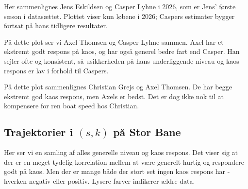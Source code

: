 Her sammenlignes Jens Eskildsen og Casper Lyhne i 2026, som er Jens' første sæson i datasættet. Plottet viser kun løbene i 2026; Caspers estimater bygger fortsat på hans tidligere resultater.


På dette plot ser vi Axel Thomsen og Casper Lyhne sammen. Axel har et ekstremt godt respons på kaos, og har også generel bedre fart end Casper. Han sejler ofte og konsistent, så usikkerheden på hans underliggende niveau og kaos respons er lav i forhold til Caspers.


På dette plot sammenlignes Christian Grejs og Axel Thomsen. De har begge ekstremt god kaos respons, men Axels er bedst. Det er dog ikke nok til at kompensere for ren boat speed hos Christian.


\subsection*{Trajektorier i $(s,k)$ på Stor Bane}
Her ser vi en samling af alles generelle niveau og kaos respons.
Det viser sig at der er en meget tydelig korrelation mellem at være generelt hurtig og respondere godt på kaos. Men der er mange både der stort set ingen kaos respons har - hverken negativ eller positiv. Lysere farver indikerer ældre data.

\XGammaTrajectoryPlotFromCsv{}


